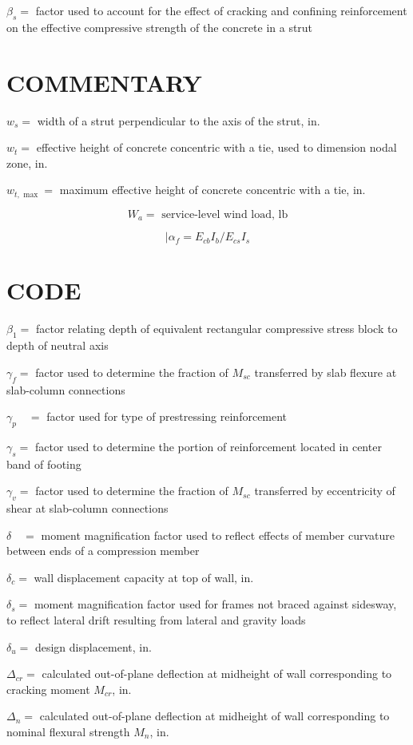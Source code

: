 \documentclass[10pt]{article}
\begin{document}
$\beta_{s}=$ factor used to account for the effect of cracking and confining reinforcement on the effective compressive strength of the concrete in a strut

\section*{COMMENTARY}
$w_{s}=$ width of a strut perpendicular to the axis of the strut, in.

$w_{t}=$ effective height of concrete concentric with a tie, used to dimension nodal zone, in.

$w_{t, \text { max }}=$ maximum effective height of concrete concentric with a tie, in.

$$
W_{a}=\text { service-level wind load, } \mathrm{lb}
$$

$$
\mid \alpha_{f}=E_{c b} I_{b} / E_{c s} I_{s}
$$

\section*{CODE}
$\beta_{1}=$ factor relating depth of equivalent rectangular compressive stress block to depth of neutral axis

$\gamma_{f}=$ factor used to determine the fraction of $M_{s c}$ transferred by slab flexure at slab-column connections

$\gamma_{p} \quad=$ factor used for type of prestressing reinforcement

$\gamma_{s}=$ factor used to determine the portion of reinforcement located in center band of footing

$\gamma_{v}=$ factor used to determine the fraction of $M_{s c}$ transferred by eccentricity of shear at slab-column connections

$\delta \quad=$ moment magnification factor used to reflect effects of member curvature between ends of a compression member

$\delta_{c}=$ wall displacement capacity at top of wall, in.

$\delta_{s}=$ moment magnification factor used for frames not braced against sidesway, to reflect lateral drift resulting from lateral and gravity loads

$\delta_{u}=$ design displacement, in.

$\Delta_{c r}=$ calculated out-of-plane deflection at midheight of wall corresponding to cracking moment $M_{c r}$, in.

$\Delta_{n}=$ calculated out-of-plane deflection at midheight of wall corresponding to nominal flexural strength $M_{n}$, in.
\end{document}
